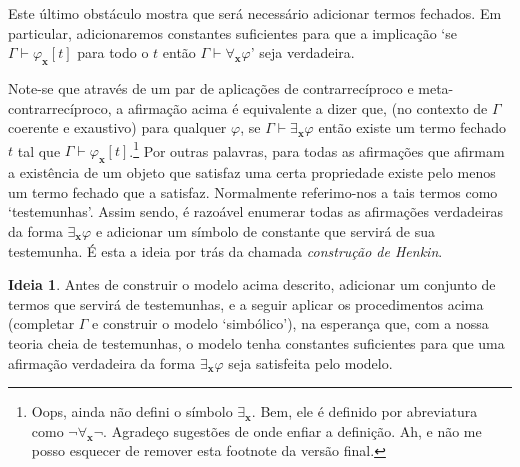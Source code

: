 \documentclass{report}
\theoremstyle{definition}
\newtheorem{ideia}{Ideia}
\theoremstyle{remark}
\renewcommand{\bf}[1]{\mathbf{#1}}
\begin{document}
	Este último obstáculo mostra que será necessário adicionar termos fechados. Em particular, adicionaremos constantes suficientes para que a implicação `se $\Gamma \vdash \varphi_{\bf x}[t]$ para todo o $t$ então $\Gamma \vdash \forall_{\bf x} \varphi$' seja verdadeira.
	
	Note-se que através de um par de aplicações de contrarrecíproco e meta-contrarrecíproco, a afirmação acima é equivalente a dizer que, (no contexto de $\Gamma$ coerente e exaustivo) para qualquer $\varphi$, se $\Gamma \vdash \exists_{\bf x} \varphi$ então existe um termo fechado $t$ tal que $\Gamma \vdash \varphi_{\bf x}[t]$.\footnote{Oops, ainda não defini o símbolo $\exists_{\bf x}$. Bem, ele é definido por abreviatura como $\neg \forall_{\bf x} \neg$. Agradeço sugestões de onde enfiar a definição. Ah, e não me posso esquecer de remover esta footnote da versão final.} %
	Por outras palavras, para todas as afirmações que afirmam a existência de um objeto que satisfaz uma certa propriedade existe pelo menos um termo fechado que a satisfaz. Normalmente referimo-nos a tais termos como `testemunhas'. Assim sendo, é razoável enumerar todas as afirmações verdadeiras da forma $\exists_{\bf x} \varphi$ e adicionar um símbolo de constante que servirá de sua testemunha. É esta a ideia por trás da chamada \emph{construção de Henkin}.
	
	\begin{ideia}
	Antes de construir o modelo acima descrito, adicionar um conjunto de termos que servirá de testemunhas, e a seguir aplicar os procedimentos acima (completar $\Gamma$ e construir o modelo `simbólico'), na esperança que, com a nossa teoria cheia de testemunhas, o modelo tenha constantes suficientes para que uma afirmação verdadeira da forma $\exists_{\bf x} \varphi$ seja satisfeita pelo modelo.
	\end{ideia}
	
\end{document}
